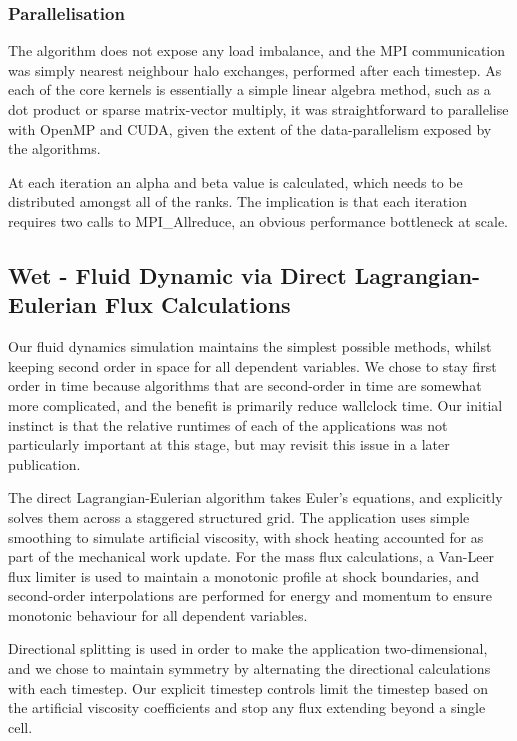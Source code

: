 \documentclass[runningheads,a4paper]{llncs}
\begin{document}
\subsubsection{Parallelisation}

The algorithm does not expose any load imbalance, and the MPI communication was simply nearest neighbour halo exchanges, performed after each timestep. As each of the core kernels is essentially a simple linear algebra method, such as a dot product or sparse matrix-vector multiply, it was straightforward to parallelise with OpenMP and CUDA, given the extent of the data-parallelism exposed by the algorithms.

At each iteration an alpha and beta value is calculated, which needs to be distributed amongst all of the ranks. The implication is that each iteration requires two calls to MPI\_Allreduce, an obvious performance bottleneck at scale. 

\subsection{Wet - Fluid Dynamic via Direct Lagrangian-Eulerian Flux Calculations}

Our fluid dynamics simulation maintains the simplest possible methods, whilst keeping second order in space for all dependent variables. We chose to stay first order in time because algorithms that are second-order in time are somewhat more complicated, and the benefit is primarily reduce wallclock time. Our initial instinct is that the relative runtimes of each of the applications was not particularly important at this stage, but may revisit this issue in a later publication.

The direct Lagrangian-Eulerian algorithm takes Euler's equations, and explicitly solves them across a staggered structured grid. The application uses simple smoothing to simulate artificial viscosity, with shock heating accounted for as part of the mechanical work update. For the mass flux calculations, a Van-Leer flux limiter is used to maintain a monotonic profile at shock boundaries, and second-order interpolations are performed for energy and momentum to ensure monotonic behaviour for all dependent variables.

Directional splitting is used in order to make the application two-dimensional, and we chose to maintain symmetry by alternating the directional calculations with each timestep. Our explicit timestep controls limit the timestep based on the artificial viscosity coefficients and stop any flux extending beyond a single cell.
\end{document}
